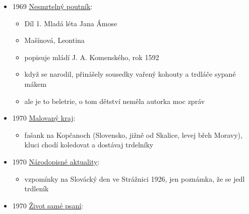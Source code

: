 \begin{itemize}
  \begin{itemize}
  \tightlist
  \item
  \item
    není online
  \item
    s. 244: 1. Ako sa robia „trdelníky``. Mi sme to tak neďelávali, jak
    už sa to fčíl ďelá. Mi už enom nech bíl trdelňík, ke-to bilo aj
    planší, je to trdelňík. Ale dneskaj to už vižaduje teda veliké
    vínose --- teda: sedem vajec lebo osem na kilo múki, na potom jeden
    kúsek másla, dvacet deko sádla zas, co sa to povrchu polévá,
  \item
    je to ukázka místního nářečí. jinak se v celý knížce věnovaný
    Skalici trdelník vůbec
  \end{itemize}
\item
  1969
  \href{https://ceskadigitalniknihovna.cz/uuid/uuid:be0ae270-94a1-11e8-9690-005056827e51}{Nesmrtelný
  poutník}:

  \begin{itemize}
  \tightlist
  \item
    Díl 1. Mladá léta Jana Ámose
  \item
    Mašínová, Leontina
  \item
    popisuje mládí J. A. Komenského, rok 1592
  \item
    když se narodil, přinášely sousedky vařený kohouty a trdláče sypané
    mákem
  \item
    ale je to beletrie, o tom dětství neměla autorka moc zpráv
  \end{itemize}
\item
  1970
  \href{https://ceskadigitalniknihovna.cz/uuid/uuid:874ae8f0-f920-11e3-b4ad-005056827e51}{Malovaný
  kraj}:

  \begin{itemize}
  \tightlist
  \item
    fašank na Kopčanoch (Slovensko, jižně od Skalice, levej břeh
    Moravy), kluci chodí koledovat a dostávaj trdelníky
  \end{itemize}
\item
  1970
  \href{https://ceskadigitalniknihovna.cz/view/uuid:733fd410-3b55-11e5-8b04-5ef3fc9bb22f?page=uuid\%3A9992ddf0-3b5b-11e5-a525-5ef3fc9ae867&fulltext=trdeln\%C3\%ADk\%20OR\%20trdeln\%C3\%ADky\%20OR\%20trdeln\%C3\%ADk\%C5\%AF&source=mzk}{Národopisné
  aktuality}:

  \begin{itemize}
  \tightlist
  \item
    vzpomínky na Slovácký den ve Strážnici 1926, jen poznámka, že se
    jedl trdleník
  \end{itemize}
\item
  1970
  \href{https://ceskadigitalniknihovna.cz/uuid/uuid:66eb0740-2f43-11e3-8d9d-005056827e51}{Život
  samé psaní}:


\end{itemize}
